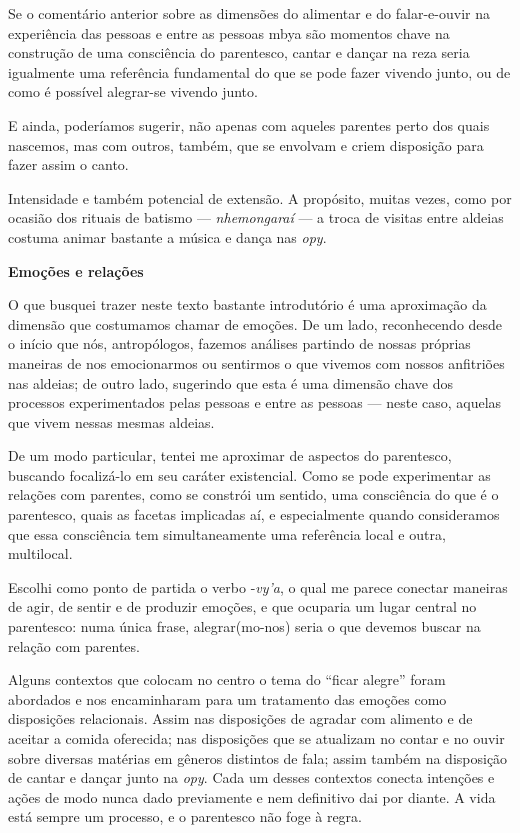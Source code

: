 Se o comentário anterior sobre as dimensões do alimentar e do
falar-e-ouvir na experiência das pessoas e entre as pessoas mbya são
momentos chave na construção de uma consciência do parentesco, cantar e
dançar na reza seria igualmente uma referência fundamental do que se
pode fazer vivendo junto, ou de como é possível alegrar-se vivendo
junto.

E ainda, poderíamos sugerir, não apenas com aqueles parentes perto dos
quais nascemos, mas com outros, também, que se envolvam e criem
disposição para fazer assim o canto.

Intensidade e também potencial de extensão. A propósito, muitas vezes,
como por ocasião dos rituais de batismo --- \emph{nhemongaraí} --- a
troca de visitas entre aldeias costuma animar bastante a música e dança
nas \emph{opy}.

\textbf{Emoções e relações}

O que busquei trazer neste texto bastante introdutório é uma aproximação
da dimensão que costumamos chamar de emoções. De um lado, reconhecendo
desde o início que nós, antropólogos, fazemos análises partindo de
nossas próprias maneiras de nos emocionarmos ou sentirmos o que vivemos
com nossos anfitriões nas aldeias; de outro lado, sugerindo que esta é
uma dimensão chave dos processos experimentados pelas pessoas e entre as
pessoas --- neste caso, aquelas que vivem nessas mesmas aldeias.

De um modo particular, tentei me aproximar de aspectos do parentesco,
buscando focalizá-lo em seu caráter existencial. Como se pode
experimentar as relações com parentes, como se constrói um sentido, uma
consciência do que é o parentesco, quais as facetas implicadas aí, e
especialmente quando consideramos que essa consciência tem
simultaneamente uma referência local e outra, multilocal.

Escolhi como ponto de partida o verbo -\emph{vy'a}, o qual me parece
conectar maneiras de agir, de sentir e de produzir emoções, e que
ocuparia um lugar central no parentesco: numa única frase,
alegrar(mo-nos) seria o que devemos buscar na relação com parentes.

Alguns contextos que colocam no centro o tema do ``ficar alegre'' foram
abordados e nos encaminharam para um tratamento das emoções como
disposições relacionais. Assim nas disposições de agradar com alimento e
de aceitar a comida oferecida; nas disposições que se atualizam no
contar e no ouvir sobre diversas matérias em gêneros distintos de fala;
assim também na disposição de cantar e dançar junto na \emph{opy}. Cada
um desses contextos conecta intenções e ações de modo nunca dado
previamente e nem definitivo dai por diante. A vida está sempre um
processo, e o parentesco não foge à regra.

